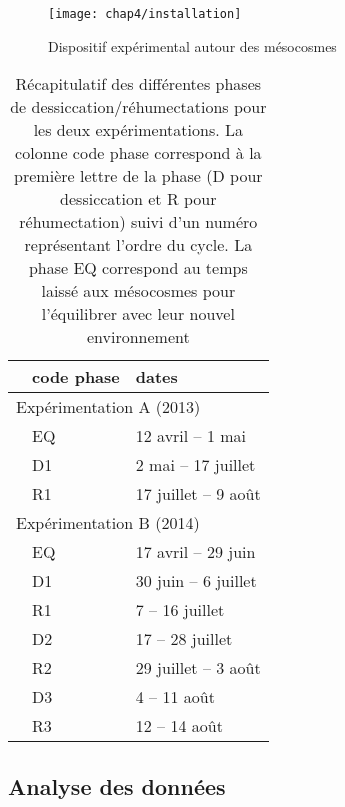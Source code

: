 \begin{figure}
\centering
\texttt{[image: chap4/installation]}
\caption{Dispositif expérimental autour des mésocosmes}
\label{fig:mesocarte}
\end{figure}

\begin{table}
\centering
\caption{Récapitulatif des différentes phases de dessiccation/réhumectations pour les deux expérimentations. La colonne code phase correspond à la première lettre de la phase (D pour dessiccation et R pour réhumectation) suivi d'un numéro représentant l'ordre du cycle. La phase EQ correspond au temps laissé aux mésocosmes pour l'équilibrer avec leur nouvel environnement }
\label{table:recap_DR}
\begin{tabular}{lll}\toprule
 & code phase & dates \\ \midrule
\multicolumn{3}{l}{Expérimentation A (2013)} \\
 & EQ & 12 avril -- 1 mai \\
 & D1 & 2 mai -- 17 juillet  \\
 & R1 & 17 juillet -- 9 août  \\ [+1ex]
\multicolumn{3}{l}{Expérimentation B (2014)} \\
 & EQ & 17 avril -- 29 juin \\
 & D1 & 30 juin -- 6 juillet \\
 & R1 & 7 -- 16 juillet\\ [+.5ex]
 & D2 & 17 -- 28 juillet\\
 & R2 & 29 juillet -- 3 août\\[+.5ex]
 & D3 & 4 -- 11 août\\
 & R3 & 12 -- 14 août\\
\bottomrule
\end{tabular}
\end{table}


\subsection{Analyse des données}

